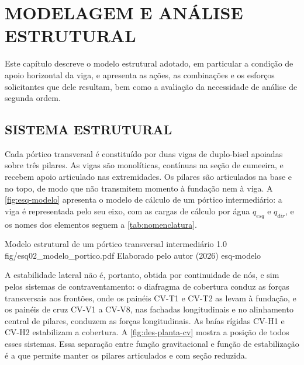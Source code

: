 
\chapter{MODELAGEM E ANÁLISE ESTRUTURAL}\label{cap:modelagem}

Este capítulo descreve o modelo estrutural adotado, em particular a condição
de apoio horizontal da viga, e apresenta as ações, as combinações e os esforços
solicitantes que dele resultam, bem como a avaliação da necessidade de análise de
segunda ordem.

\section{SISTEMA ESTRUTURAL}\label{sec:sistema-estrutural}

Cada pórtico transversal é constituído por duas vigas de duplo-bisel apoiadas
sobre três pilares. As vigas são monolíticas, contínuas na seção de cumeeira, e
recebem apoio articulado nas extremidades. Os pilares são articulados na base e
no topo, de modo que não transmitem momento à fundação nem à viga. A
\autoref{fig:esq-modelo} apresenta o modelo de cálculo de um pórtico intermediário:
a viga é representada pelo seu eixo, com as cargas de cálculo por água
$q_{esq}$ e $q_{dir}$, e os nomes dos elementos seguem a
\autoref{tab:nomenclatura}.

\figura
{Modelo estrutural de um pórtico transversal intermediário}
{1.0}
{fig/esq02_modelo_portico.pdf}
{Elaborado pelo autor (2026)}
{esq-modelo}
{}
{}

A estabilidade lateral não é, portanto, obtida por continuidade de nós, e sim
pelos sistemas de contraventamento: o diafragma de cobertura conduz as forças
transversais aos frontões, onde os painéis CV-T1 e CV-T2 as levam à fundação, e
os painéis de cruz CV-V1 a CV-V8, nas fachadas longitudinais e no alinhamento
central de pilares, conduzem as forças longitudinais. As baías rígidas CV-H1 e
CV-H2 estabilizam a cobertura. A \autoref{fig:des-planta-cv} mostra a posição de
todos esses sistemas. Essa separação entre função
gravitacional e função de estabilização é a que permite manter os pilares
articulados e com seção reduzida.

